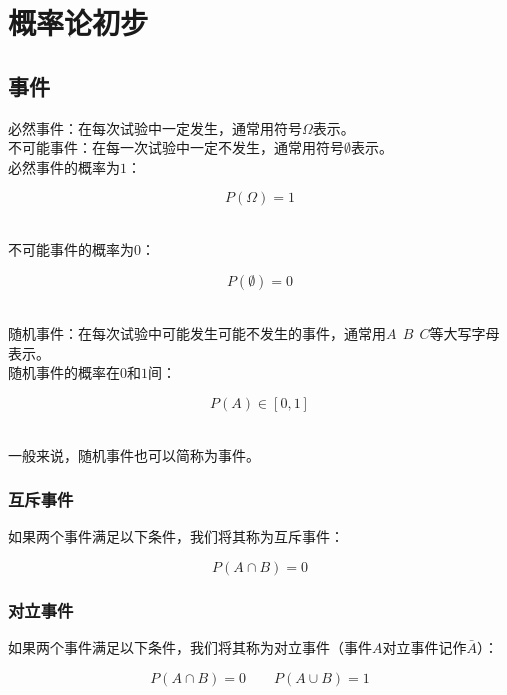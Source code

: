 \documentclass[UTF8]{ctexart}
\begin{document}
\newpage

\section{概率论初步}
    
\subsection{事件}
    必然事件：在每次试验中一定发生，通常用符号$\Omega$表示。\\[3mm]
    不可能事件：在每一次试验中一定不发生，通常用符号$\emptyset$表示。\\[3mm]
    必然事件的概率为$1$：
    \begin{large}
        \begin{equation*}
            P(\Omega)=1
        \end{equation*}
    \end{large}\\
    不可能事件的概率为$0$：
    \begin{large}
        \begin{equation*}
            P(\emptyset)=0
        \end{equation*}
    \end{large}\\[1mm]
    随机事件：在每次试验中可能发生可能不发生的事件，通常用$A~~B~~C$等大写字母表示。\\[3mm]
    随机事件的概率在$0$和$1$间：
    \begin{large}
        \begin{equation*}
            P(A)\in[0,1]
        \end{equation*}
    \end{large}\\
    一般来说，随机事件也可以简称为事件。

\subsubsection{互斥事件}
    如果两个事件满足以下条件，我们将其称为互斥事件：
    \begin{large}
        \begin{equation*}
            P(A\cap B)=0
        \end{equation*}
    \end{large}
    \vspace{-20pt}

\subsubsection{对立事件}
    如果两个事件满足以下条件，我们将其称为对立事件（事件$A$对立事件记作$\bar{A}$）：
    \begin{large}
        \begin{equation*}
            P(A\cap B)=0\qquad P(A\cup B)=1
        \end{equation*}
    \end{large}
    \vspace{-20pt}
\end{document}
